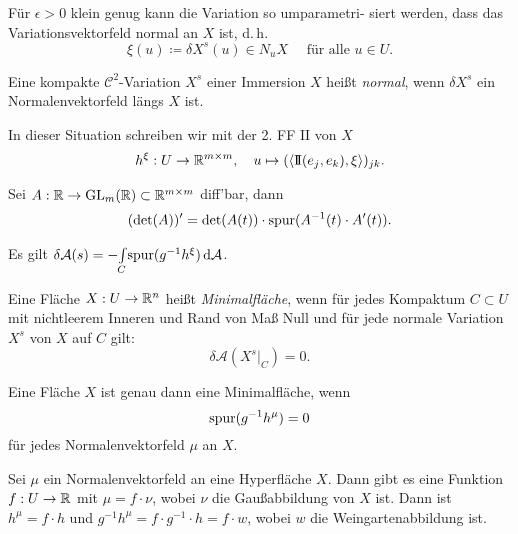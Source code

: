\documentclass{cheat-sheet}
\newcommand{\FFII}{\mathrm{I\!I}} %
\newcommand{\A}{\mathcal{A}} %
\begin{document}
\begin{lem}
  Für $\epsilon > 0$ klein genug kann die Variation so umparametri- siert werden, dass das Variationsvektorfeld normal an $X$ ist, d.\,h.
  \[ \xi(u) \coloneqq \delta X^s(u) \in N_u X \quad \text{ für alle } u \in U. \]
\end{lem}

\begin{defn}
  Eine kompakte $\mathcal{C}^2$-Variation $X^s$ einer Immersion $X$ heißt \emph{normal}, wenn $\delta X^s$ ein Normalenvektorfeld längs $X$ ist.
\end{defn}

\begin{defn}
  In dieser Situation schreiben wir mit der 2. FF $\FFII$ von $X$
  \[ h^\xi : U \to \R^{m \times m}, \quad u \mapsto (\langle \FFII(e_j, e_k), \xi \rangle)_{jk}. \]
\end{defn}

\begin{lem}
  Sei $A : \mathbb{R} \to \mathrm{GL}_m(\mathbb{R}) \subset \mathbb{R}^{m \times m}$ diff'bar, dann
  \[ (\det(A))' = \det(A(t)) \cdot \mathrm{spur}(A^{-1}(t) \cdot A'(t)). \]
\end{lem}

\begin{satz}[1. Variation]
  Es gilt $\delta \A(s) = - \Int{C}{}{\spur(g^{-1} h^\xi)}{\A}$.
\end{satz}

\begin{defn}
  Eine Fläche $X : U \to \mathbb{R}^n$ heißt \emph{Minimalfläche}, wenn für jedes Kompaktum $C \subset U$ mit nichtleerem Inneren und Rand von Maß Null und für jede normale Variation $X^s$ von $X$ auf $C$ gilt:
  \[ \delta \A(X^s|_C) = 0. \]
\end{defn}

\begin{satz}
  Eine Fläche $X$ ist genau dann eine Minimalfläche, wenn
  \[ \mathrm{spur}(g^{-1} h^{\mu}) = 0 \]
  für jedes Normalenvektorfeld $\mu$ an $X$.
\end{satz}



\begin{bem}
  Sei $\mu$ ein Normalenvektorfeld an eine Hyperfläche $X$. Dann gibt es eine Funktion $f : U \to \mathbb{R}$ mit $\mu = f \cdot \nu$, wobei $\nu$ die Gaußabbildung von $X$ ist. Dann ist $h^\mu = f \cdot h$ und $g^{-1} h^{\mu} = f \cdot g^{-1} \cdot h = f \cdot w$, wobei $w$ die Weingartenabbildung ist.
\end{bem}
\end{document}

